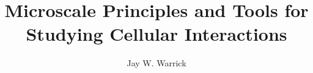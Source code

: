 \documentclass[11pt]{report}
\begin{document}
\title{Microscale Principles and Tools for Studying Cellular Interactions}
\author{Jay W. Warrick}



\beforepreface
{}
 



 
% 
\listoffigures
\listoftables

\afterpreface


% 
% 
% 
% 
% 
% 
% 
% 



\appendix       %
% 
% 
% 
% 
% 
% 
% 


\begin{singlespacing}
% 
\end{singlespacing}
\end{document}
